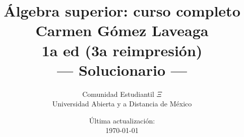 \documentclass[12pt]{book}
\title{Álgebra superior: curso completo  \\ Carmen Gómez Laveaga \\ 1a ed (3a reimpresión) \\ --- Solucionario ---}
\author{Comunidad Estudiantil $\Xi$ \\ Universidad Abierta y a Distancia de México}
\date{Última actualización: \\ \today}
\begin{document}
\maketitle

\newcommand{\solucion}{\underline{Solución} \vspace*{0.2cm}}

\tableofcontents

\setcounter{chapter}{-1}
















\end{document}
